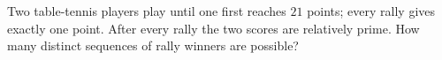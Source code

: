 Two table-tennis players play until one first reaches $21$ points; every rally gives exactly one point. After every rally the two scores are relatively prime. How many distinct sequences of rally winners are possible?
